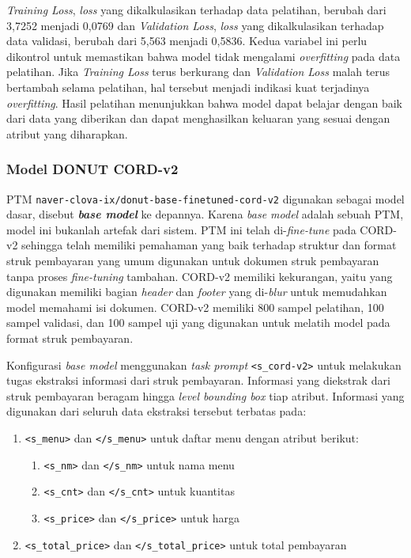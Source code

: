 \emph{Training Loss}, \emph{loss} yang dikalkulasikan terhadap data pelatihan, berubah dari 3,7252 menjadi 0,0769 dan \emph{Validation Loss}, \emph{loss} yang dikalkulasikan terhadap data validasi, berubah dari 5,563 menjadi 0,5836. Kedua variabel ini perlu dikontrol untuk memastikan bahwa model tidak mengalami \emph{overfitting} pada data pelatihan. Jika \emph{Training Loss} terus berkurang dan \emph{Validation Loss} malah terus bertambah selama pelatihan, hal tersebut menjadi indikasi kuat terjadinya \emph{overfitting}. Hasil pelatihan menunjukkan bahwa model dapat belajar dengan baik dari data yang diberikan dan dapat menghasilkan keluaran yang sesuai dengan atribut yang diharapkan.

\subsubsection{Model DONUT CORD-v2}
\label{subsubsec:model-base}

PTM \donut{} \texttt{naver-clova-ix/donut-base-finetuned-cord-v2} digunakan sebagai model dasar, disebut \textbf{\emph{base model}} ke depannya. Karena \emph{base model} adalah sebuah PTM, model ini bukanlah artefak dari sistem. PTM ini telah di-\emph{fine-tune} pada \dataset{} CORD-v2 sehingga telah memiliki pemahaman yang baik terhadap struktur dan format struk pembayaran yang umum digunakan untuk dokumen struk pembayaran tanpa proses \emph{fine-tuning} tambahan. \datasetfl{} CORD-v2 memiliki kekurangan, yaitu \dataset{} yang digunakan memiliki bagian \emph{header} dan \emph{footer} yang di-\emph{blur} untuk memudahkan model memahami isi dokumen. \datasetfl{} CORD-v2 memiliki 800 sampel pelatihan, 100 sampel validasi, dan 100 sampel uji yang digunakan untuk melatih model \donut{} pada format struk pembayaran.

Konfigurasi \emph{base model} menggunakan \emph{task prompt} \texttt{<s\_cord-v2>} untuk melakukan tugas ekstraksi informasi dari struk pembayaran. Informasi yang diekstrak dari struk pembayaran beragam hingga \emph{level bounding box} tiap atribut. Informasi yang digunakan dari seluruh data ekstraksi tersebut terbatas pada:
\begin{enumerate}
    \item \texttt{<s\_menu>} dan \texttt{</s\_menu>} untuk daftar menu dengan atribut berikut:
    \begin{enumerate}
        \item \texttt{<s\_nm>} dan \texttt{</s\_nm>} untuk nama menu
        \item \texttt{<s\_cnt>} dan \texttt{</s\_cnt>} untuk kuantitas
        \item \texttt{<s\_price>} dan \texttt{</s\_price>} untuk harga
    \end{enumerate}
    \item \texttt{<s\_total\_price>} dan \texttt{</s\_total\_price>} untuk total pembayaran
\end{enumerate}

